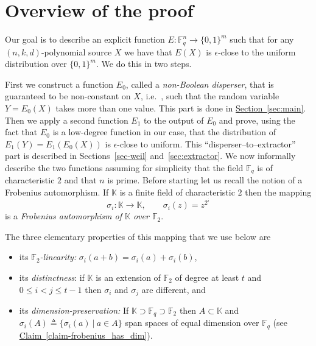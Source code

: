 \documentclass[10pt]{article}
\theoremstyle{definition}
\providecommand{\ie}{i.e.\ }
\numberwithin{equation}{section}
\newcommand{\expref}[2]{\texorpdfstring{\hyperref[#2]{#1~\ref{#2}}}{#1~\ref{#2}}}
\newcommand{\eps}{\epsilon}
\newcommand{\F}{\mathbb F_q}
\newcommand{\Ft}{{\mathbb{F}_{2}}}
\newcommand{\K}{{\mathbb{K}}}
\begin{document}
\section{Overview of the proof}

Our goal is to describe an explicit function $E:\F^n \to \{0,1\}^m$
such that for any $(n,k,d)$-polynomial source $X$ we have that
$E(X)$ is $\eps$-close to the
%
%
uniform distribution over $\{0,1\}^m$.  We do this in two steps.

First we construct a function $E_0$, called a \emph{non-Boolean disperser}, that is guaranteed to be non-constant on $X$, \ie,
such that the 
%
%
random variable $Y=E_0(X)$ takes more than one value.
This part is done in \expref{Section}{sec:main}.
Then we apply a second function $E_1$ to the output of $E_0$ and prove, using the fact that $E_0$ is a low-degree function in our case, 
that the distribution of %
$E_1(Y)=E_1(E_0(X))$ is $\eps$-close to uniform.
 This ``disperser--to--extractor'' part is described in Sections~\ref{sec-weil} and~\ref{sec:extractor}.
 We now informally describe the two functions assuming for simplicity
that %
the field $\F$ is of characteristic $2$ and that $n$ is prime.
Before starting let us recall the notion of a Frobenius automorphism.
If $\K$ is a finite field of characteristic $2$ then the mapping
\[\sigma_i:\K\to \K, \qquad \sigma_i(z)=z^{2^i}\] is a
\emph{Frobenius automorphism of $\K$ over $\Ft$}.
%
%
%

%
%
%
%
%
%
%
%

%
%
%
%
The three elementary properties of this mapping that we use below are
%
%
%
%
%
%
%
%
%
%
\begin{itemize}
\item[(i)] its \emph{$\Ft$-linearity:} $\sigma_i(a+b)=\sigma_i(a)+\sigma_i(b)$,
\item[(ii)] its \emph{distinctness}: if $\K$ is an extension of $\Ft$ of
   degree at least $t$ and $0\leq i<j\leq t-1$ then $\sigma_i$ and
   $\sigma_j$ are different, and
\item[(iii)] its \emph{dimension-preservation:} If $\K\supset\F\supset\Ft$
 then $A\subset \K$ and $\sigma_i(A)\triangleq \{\sigma_i(a) \ | \ a\in A\}$
 span spaces of equal dimension over $\F$
 (see \expref{Claim}{claim-frobenius_has_dim}).
\end{itemize}
\end{document}
